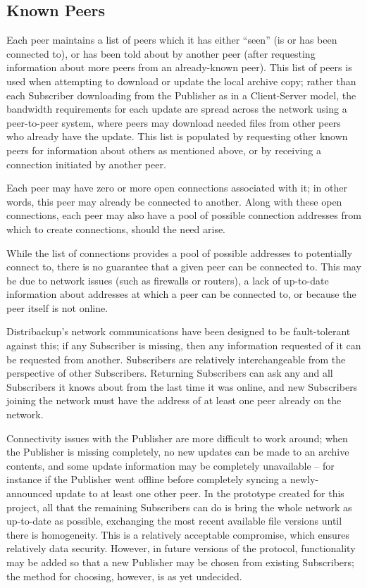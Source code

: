 \documentclass[12pt,a4paper,]{adreport}
\begin{document}
\subsection{Known Peers}\label{known-peers}

Each peer maintains a list of peers which it has either ``seen'' (is or
has been connected to), or has been told about by another peer (after
requesting information about more peers from an already-known peer).
This list of peers is used when attempting to download or update the
local archive copy; rather than each Subscriber downloading from the
Publisher as in a Client-Server model, the bandwidth requirements for
each update are spread across the network using a peer-to-peer system,
where peers may download needed files from other peers who already have
the update. This list is populated by requesting other known peers for
information about others as mentioned above, or by receiving a
connection initiated by another peer.

Each peer may have zero or more open connections associated with it; in
other words, this peer may already be connected to another. Along with
these open connections, each peer may also have a pool of possible
connection addresses from which to create connections, should the need
arise.

While the list of connections provides a pool of possible addresses to
potentially connect to, there is no guarantee that a given peer can be
connected to. This may be due to network issues (such as firewalls or
routers), a lack of up-to-date information about addresses at which a
peer can be connected to, or because the peer itself is not online.

Distribackup's network communications have been designed to be
fault-tolerant against this; if any Subscriber is missing, then any
information requested of it can be requested from another. Subscribers
are relatively interchangeable from the perspective of other
Subscribers. Returning Subscribers can ask any and all Subscribers it
knows about from the last time it was online, and new Subscribers
joining the network must have the address of at least one peer already
on the network.

Connectivity issues with the Publisher are more difficult to work
around; when the Publisher is missing completely, no new updates can be
made to an archive contents, and some update information may be
completely unavailable -- for instance if the Publisher went offline
before completely syncing a newly-announced update to at least one other
peer. In the prototype created for this project, all that the remaining
Subscribers can do is bring the whole network as up-to-date as possible,
exchanging the most recent available file versions until there is
homogeneity. This is a relatively acceptable compromise, which ensures
relatively data security. However, in future versions of the protocol,
functionality may be added so that a new Publisher may be chosen from
existing Subscribers; the method for choosing, however, is as yet
undecided.
\end{document}
